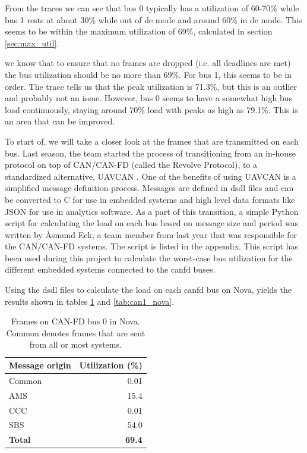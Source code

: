 From the traces we can see that bus 0 typically has a utilization of 60-70\% while bus 1 rests at about 30\% while out of \acrshort{de} mode and around 60\% in \acrshort{de} mode. This seems to be within the maximum utilization of 69\%, calculated in section \ref{sec:max_util}.

we know that to ensure that no frames are dropped (i.e. all deadlines are met) the bus utilization should be no more than 69\%. For bus 1, this seems to be in order. The trace tells us that the peak utilization is 71.3\%, but this is an outlier and probably not an issue. However, bus 0 seems to have a somewhat high bus load continuously, staying around 70\% load with peaks as high as 79.1\%. This is an area that can be improved.

To start of, we will take a closer look at the frames that are transmitted on each bus. Last season, the team started the process of transitioning from an in-house protocol on top of CAN/CAN-FD (called the Revolve Protocol), to a standardized alternative, UAVCAN \cite{uavcan}. One of the benefits of using UAVCAN is a simplified message definition process. Messages are defined in \acrfull{dsdl} files and can be converted to C for use in embedded systems and high level data formats like JSON for use in analytics software. As a part of this transition, a simple Python script for calculating the load on each bus based on message size and period was written by Åsmund Eek, a team member from last year that was responsible for the CAN/CAN-FD systems. The script is listed in the appendix. This script has been used during this project to calculate the worst-case bus utilization for the different embedded systems connected to the \acrshort{canfd} buses. 

Using the \acrshort{dsdl} files to calculate the load on each \acrshort{canfd} bus on Nova, yields the results shown in tables \ref{tab:can0_nova} and \ref{tab:can1_nova}.

\begin{table}[H]
    \centering
    \caption{Frames on CAN-FD bus 0 in Nova. Common denotes frames that are sent from all or most systems.}
    \begin{tabular}{lr}
        \toprule
        Message origin & Utilization (\%) \\
        \midrule
        Common & 0.01 \\
        AMS & 15.4 \\
        CCC & 0.01 \\
        SBS & 54.0 \\
        \textbf{Total} & \textbf{69.4} \\
        \bottomrule
    \end{tabular}
    \label{tab:can0_nova}
\end{table}

